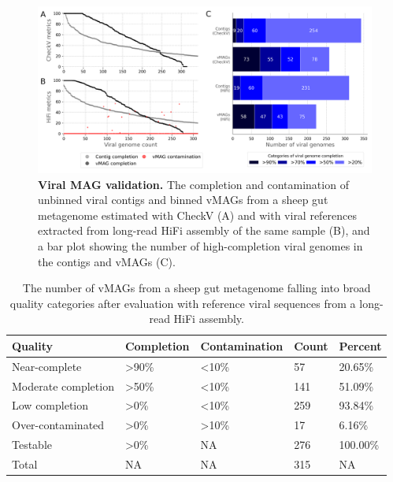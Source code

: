 \begin{figure}[t]
    \centering
    \includegraphics[width=1\textwidth]{Figures/figure_binning_validation.png}
    \caption{\textbf{Viral MAG validation.} The completion and contamination of unbinned viral contigs and binned vMAGs from a sheep gut metagenome estimated with CheckV (A) and with viral references extracted from long-read HiFi assembly of the same sample (B), and a bar plot showing the number of high-completion viral genomes in the contigs and vMAGs (C).}
    \label{fig:figure_binning_validation}
 \end{figure}
 
 
\begin{table}[]
\centering
\begin{tabular}{lllll}
\toprule
Quality & Completion & Contamination & Count & Percent \\
\midrule
Near-complete & \textgreater 90\% & \textless{}10\% & 57 & 20.65\% \\
Moderate   completion & \textgreater 50\% & \textless 10\% & 141 & 51.09\% \\
Low   completion & \textgreater 0\% & \textless 10\% & 259 & 93.84\% \\
Over-contaminated & \textgreater 0\% & \textgreater 10\% & 17 & 6.16\% \\
Testable & \textgreater 0\% & NA & 276 & 100.00\% \\
Total & NA & NA & 315 & NA \\
\bottomrule
\end{tabular}
\caption{The number of vMAGs from a sheep gut metagenome falling into broad quality categories after evaluation with reference viral sequences from a long-read HiFi assembly.}
\end{table}



 
